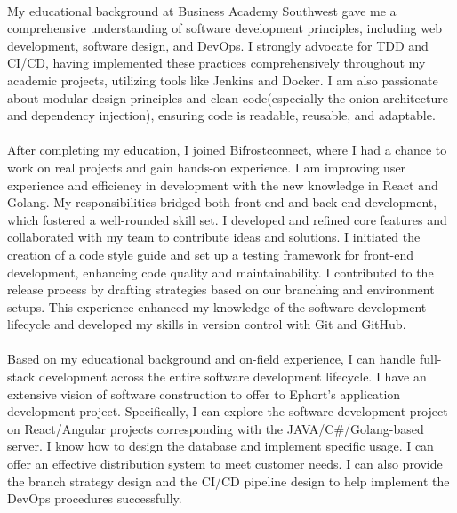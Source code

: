 \paragraph{}
My educational background at Business Academy Southwest gave me a comprehensive understanding of software development principles, including web development, software design, and DevOps. I strongly advocate for TDD and CI/CD, having implemented these practices comprehensively throughout my academic projects, utilizing tools like Jenkins and Docker. I am also passionate about modular design principles and clean code(especially the onion architecture and dependency injection), ensuring code is readable, reusable, and adaptable. 

\paragraph{}
After completing my education, I joined Bifrostconnect, where I had a chance to work on real projects and gain hands-on experience. I am improving user experience and efficiency in development with the new knowledge in React and Golang. My responsibilities bridged both front-end and back-end development, which fostered a well-rounded skill set. I developed and refined core features and collaborated with my team to contribute ideas and solutions. I initiated the creation of a code style guide and set up a testing framework for front-end development, enhancing code quality and maintainability. I contributed to the release process by drafting strategies based on our branching and environment setups. This experience enhanced my knowledge of the software development lifecycle and developed my skills in version control with Git and GitHub.

\paragraph{}
Based on my educational background and on-field experience, I can handle full-stack development across the entire software development lifecycle. I have an extensive vision of software construction to offer to Ephort's application development project. Specifically, I can explore the software development project on React/Angular projects corresponding with the JAVA/C\#/Golang-based server. I know how to design the database and implement specific usage. I can offer an effective distribution system to meet customer needs. I can also provide the branch strategy design and the CI/CD pipeline design to help implement the DevOps procedures successfully.

